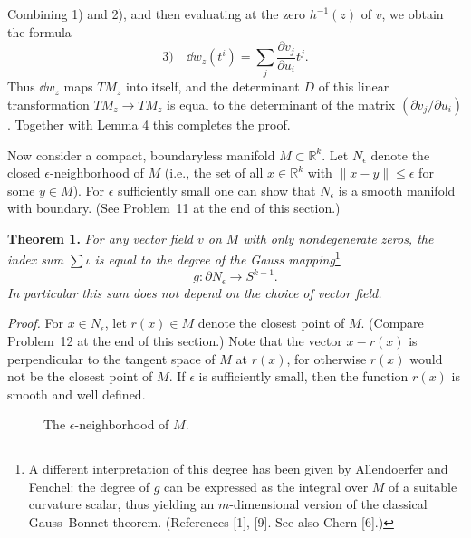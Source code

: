 
Combining 1) and 2), and then evaluating at the zero $h^{-1}(z)$ of $v$, we obtain the formula
\[
\text{3)} \quad \dd w_z(t^i) = \sum_j \frac{\partial v_j}{\partial u_i} t^j.
\]
Thus $\dd w_z$ maps $TM_z$ into itself, and the determinant $D$ of this linear transformation $TM_z \to TM_z$ is equal to the determinant of the matrix $(\partial v_j / \partial u_i)$. Together with Lemma 4 this completes the proof.

Now consider a compact, boundaryless manifold $M \subset \mathbb{R}^k$. Let $N_\epsilon$ denote the closed $\epsilon$-neighborhood of $M$ (i.e., the set of all $x \in \mathbb{R}^k$ with $\|x - y\| \leq \epsilon$ for some $y \in M$). For $\epsilon$ sufficiently small one can show that $N_\epsilon$ is a smooth manifold with boundary. (See Problem~11 at the end of this section.)

\noindent\textbf{Theorem 1.} \textit{For any vector field $v$ on $M$ with only nondegenerate zeros, the index sum $\sum \iota$ is equal to the degree of the Gauss mapping}\footnote{A different interpretation of this degree has been given by Allendoerfer and Fenchel: the degree of $g$ can be expressed as the integral over $M$ of a suitable curvature scalar, thus yielding an $m$-dimensional version of the classical Gauss--Bonnet theorem. (References [1], [9]. See also Chern [6].)}
\[
g : \partial N_\epsilon \to S^{k-1}.
\]
\textit{In particular this sum does not depend on the choice of vector field.}

\noindent\textit{Proof.}
For $x \in N_\epsilon$, let $r(x) \in M$ denote the closest point of $M$. (Compare Problem~12 at the end of this section.) Note that the vector $x - r(x)$ is perpendicular to the tangent space of $M$ at $r(x)$, for otherwise $r(x)$ would not be the closest point of $M$. If $\epsilon$ is sufficiently small, then the function $r(x)$ is smooth and well defined.

\begin{figure}[htbp]
\centering
\setcounter{figure}{13}%
\caption{The $\epsilon$-neighborhood of $M$.}\label{fig:milnor-14}
\end{figure}




